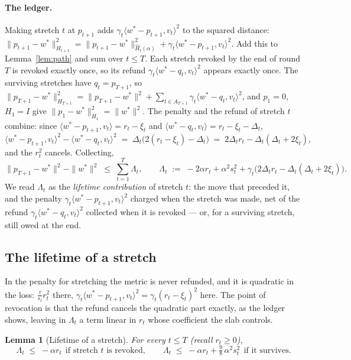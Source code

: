 \documentclass[11pt]{article}
\theoremstyle{plain}
\newtheorem{lemma}[theorem]{Lemma}
\theoremstyle{definition}
\theoremstyle{remark}
\newcommand{\wstar}{w^{\ast}}
\newcommand{\ip}[2]{\langle #1, #2\rangle}
\begin{document}
\paragraph{The ledger.} Making stretch $t$ at $p_{t+1}$ adds $\gamma_t\ip{\wstar-p_{t+1}}{v_t}^{2}$
to the squared distance: $\|p_{t+1}-\wstar\|_{H_{t+1}}^{2}=\|p_{t+1}-\wstar\|_{\hat H_t(\alpha)}^{2}
+\gamma_t\ip{\wstar-p_{t+1}}{v_t}^{2}$. Add this to Lemma~\ref{lem:path} and sum over $t\le T$. Each
stretch revoked by the end of round $T$ is revoked exactly once, so its refund
$\gamma_t\ip{\wstar-q_t}{v_t}^{2}$ appears exactly once. The surviving stretches have $q_t=p_{T+1}$,
so $\|p_{T+1}-\wstar\|_{H_{T+1}}^{2}=\|p_{T+1}-\wstar\|^{2}+\sum_{t\in
A_{T+1}}\gamma_t\ip{\wstar-q_t}{v_t}^{2}$, and $p_1=0$, $H_1=I$ give
$\|p_1-\wstar\|_{H_1}^{2}=\|\wstar\|^{2}$. The penalty and the refund of stretch $t$ combine: since
$\ip{\wstar-p_{t+1}}{v_t}=r_t-\xi_t$ and $\ip{\wstar-q_t}{v_t}=r_t-\xi_t-\Delta_t$,
\[
  \ip{\wstar-p_{t+1}}{v_t}^{2}-\ip{\wstar-q_t}{v_t}^{2}
  \;=\;\Delta_t\bigl(2(r_t-\xi_t)-\Delta_t\bigr)\;=\;2\Delta_tr_t-\Delta_t(\Delta_t+2\xi_t) ,
\]
and the $r_t^{2}$ cancels. Collecting,
\begin{equation}\label{eq:ledger}
  \|p_{T+1}-\wstar\|^{2}-\|\wstar\|^{2}\;\le\;\sum_{t=1}^{T}\Lambda_t,\qquad
  \Lambda_t\;:=\;-2\alpha r_t+\alpha^{2}s_t^{2}
  +\gamma_t\bigl(2\Delta_tr_t-\Delta_t(\Delta_t+2\xi_t)\bigr) .
\end{equation}
We read $\Lambda_t$ as the \emph{lifetime contribution} of stretch $t$: the move that preceded it,
and the penalty $\gamma_t\ip{\wstar-p_{t+1}}{v_t}^{2}$ charged when the stretch was made, net of the
refund $\gamma_t\ip{\wstar-q_t}{v_t}^{2}$ collected when it is revoked --- or, for a surviving
stretch, still owed at the end.

\subsection{The lifetime of a stretch}\label{sec:lifetime}

In \cite{Cai26} the penalty for stretching the metric is never refunded, and it is quadratic in the
loss: $\tfrac{\tau}{s_t}r_t^{2}$ there, $\gamma_t\ip{\wstar-p_{t+1}}{v_t}^{2}=\gamma_t(r_t-\xi_t)^{2}$
here. The point of revocation is that the refund cancels the quadratic part exactly, as the ledger
shows, leaving in $\Lambda_t$ a term linear in $r_t$ whose coefficient the slab controls.

\begin{lemma}[Lifetime of a stretch]\label{lem:lifetime}
For every $t\le T$ (recall $r_t\ge0$),
\[
  \Lambda_t\;\le\;-\alpha r_t\ \ \text{if stretch $t$ is revoked},\qquad
  \Lambda_t\;\le\;-\alpha r_t+\tfrac98\,\alpha^{2}s_t^{2}\ \ \text{if it survives} .
\]
\end{lemma}
\end{document}
